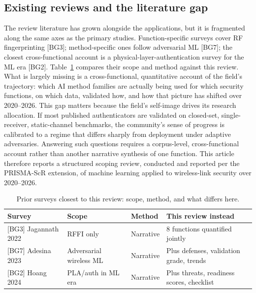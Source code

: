 \subsection{Existing reviews and the literature gap}
The review literature has grown alongside the applications, but it is fragmented along the same axes as the primary studies. Function-specific surveys cover RF fingerprinting [BG3]; method-specific ones follow adversarial ML [BG7]; the closest cross-functional account is a physical-layer-authentication survey for the ML era [BG2]. Table~\ref{tab:priors} compares their scope and method against this review. What is largely missing is a cross-functional, quantitative account of the field's trajectory: which AI method families are actually being used for which security functions, on which data, validated how, and how that picture has shifted over 2020--2026. This gap matters because the field's self-image drives its research allocation. If most published authenticators are validated on closed-set, single-receiver, static-channel benchmarks, the community's sense of progress is calibrated to a regime that differs sharply from deployment under adaptive adversaries. Answering such questions requires a corpus-level, cross-functional account rather than another narrative synthesis of one function. This article therefore reports a structured scoping review, conducted and reported per the PRISMA-ScR extension, of machine learning applied to wireless-link security over 2020--2026.

\begin{table}[tbp]
\centering
\footnotesize
\caption{Prior surveys closest to this review: scope, method, and what differs here.}
\label{tab:priors}
\begin{tabular}{@{}l p{3.6cm} p{2.6cm} p{5.2cm}@{}}
\toprule
Survey & Scope & Method & This review instead \\
\midrule
{[BG3]} Jagannath 2022 & RFFI only & Narrative & 8 functions quantified jointly \\
{[BG7]} Adesina 2023 & Adversarial wireless ML & Narrative & Plus defenses, validation grade, trends \\
{[BG2]} Hoang 2024 & PLA/auth in ML era & Narrative & Plus threats, readiness scores, checklist \\
\bottomrule
\end{tabular}
\end{table}

